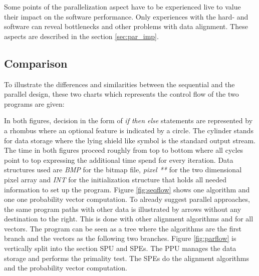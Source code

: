 Some points of the parallelization aspect have to be experienced live to value their impact on the software performance. Only experiences with the hard- and software can reveal bottlenecks and other problems with data alignment. These aspects are described in the section \ref{sec:par_imp}.

\subsection{Comparison}
\label{sec:designcomp}

To illustrate the differences and similarities between the sequential and the parallel design, these two charts which represents the control flow of the two programs are given:

\begin{figure}[H]
\begin{minipage}[t]{0.475\textwidth}
\centering
\end{minipage}
\hfill
\begin{minipage}[t]{0.475\textwidth}
\centering
\end{minipage}
\end{figure}

In both figures, decision in the form of \emph{if then else} statements are represented by a rhombus where an optional feature is indicated by a circle. The cylinder stands for data storage where the lying shield like symbol is the standard output stream. The time in both figures proceed roughly from top to bottom where all cycles point to top expressing the additional time spend for every iteration. Data structures used are \emph{BMP}  for the bitmap file, \emph{pixel **} for the two dimensional pixel array and \emph{INT} for the initialization structure that holds all needed information to set up the program.
Figure \ref{fig:seqflow} shows one algorithm and one one probability vector computation. To already suggest parallel approaches, the same program paths with other data is illustrated by arrows without any destination to the right. This is done with other alignment algorithms and for all vectors. The program can be seen as a tree where the algorithms are the first branch and the vectors as the following two branches.
Figure \ref{fig:parflow} is vertically split into the section SPU and SPEs. The PPU manages the data storage and performs the primality test. The SPEs do the alignment algorithms and the probability vector computation.

